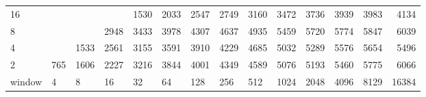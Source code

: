 \begin{table}[h]
{\begin{tabular}{lrrrrrrrrrrrrr}
			\multicolumn{1}{|l|}{16} &  &  &  & \cellcolor[HTML]{99E600}1530 & \cellcolor[HTML]{E69900}2033 & \cellcolor[HTML]{E69900}2547 & \cellcolor[HTML]{E60000}2749 & \cellcolor[HTML]{E60000}3160 & \cellcolor[HTML]{E60000}3472 & \cellcolor[HTML]{E60000}3736 & \cellcolor[HTML]{9900E6}3939 & \cellcolor[HTML]{9900E6}3983 & \cellcolor[HTML]{9900E6}4134 \\ \cline{1-1}
			\multicolumn{1}{|l|}{8} &  &  & \cellcolor[HTML]{E60000}2948 & \cellcolor[HTML]{E60000}3433 & \cellcolor[HTML]{9900E6}3978 & \cellcolor[HTML]{9900E6}4307 & \cellcolor[HTML]{9900E6}4637 & \cellcolor[HTML]{4C00E6}4935 & \cellcolor[HTML]{4C00E6}5459 & \cellcolor[HTML]{4C00E6}5720 & \cellcolor[HTML]{4C00E6}5774 & \cellcolor[HTML]{4C00E6}5847 & \cellcolor[HTML]{4C00E6}6039 \\ \cline{1-1}
			\multicolumn{1}{|l|}{4} &  & \cellcolor[HTML]{E69900}1533 & \cellcolor[HTML]{E69900}2561 & \cellcolor[HTML]{E60000}3155 & \cellcolor[HTML]{E60000}3591 & \cellcolor[HTML]{9900E6}3910 & \cellcolor[HTML]{9900E6}4229 & \cellcolor[HTML]{9900E6}4685 & \cellcolor[HTML]{4C00E6}5032 & \cellcolor[HTML]{4C00E6}5289 & \cellcolor[HTML]{4C00E6}5576 & \cellcolor[HTML]{4C00E6}5654 & \cellcolor[HTML]{4C00E6}5496 \\ \cline{1-1}
			\multicolumn{1}{|l|}{2} & \cellcolor[HTML]{99E600}765 & \cellcolor[HTML]{E69900}1606 & \cellcolor[HTML]{E60000}2227 & \cellcolor[HTML]{E60000}3216 & \cellcolor[HTML]{9900E6}3844 & \cellcolor[HTML]{9900E6}4001 & \cellcolor[HTML]{9900E6}4349 & \cellcolor[HTML]{9900E6}4589 & \cellcolor[HTML]{4C00E6}5076 & \cellcolor[HTML]{4C00E6}5193 & \cellcolor[HTML]{4C00E6}5460 & \cellcolor[HTML]{4C00E6}5775 & \cellcolor[HTML]{4C00E6}6066 \\ \hline
			\multicolumn{1}{l|}{window} & \multicolumn{1}{l|}{4} & \multicolumn{1}{l|}{8} & \multicolumn{1}{l|}{16} & \multicolumn{1}{l|}{32} & \multicolumn{1}{l|}{64} & \multicolumn{1}{l|}{128} & \multicolumn{1}{l|}{256} & \multicolumn{1}{l|}{512} & \multicolumn{1}{l|}{1024} & \multicolumn{1}{l|}{2048} & \multicolumn{1}{l|}{4096} & \multicolumn{1}{l|}{8129} & \multicolumn{1}{l|}{16384} \\ \cline{2-14} 
		\end{tabular}
	}
\end{table}

